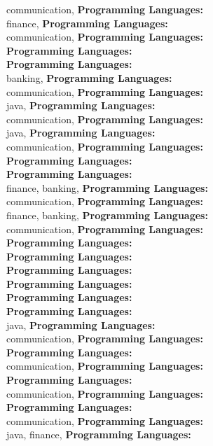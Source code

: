 communication, \textbf{Programming Languages:} \\
finance, \textbf{Programming Languages:} \\
communication, \textbf{Programming Languages:} \\
\textbf{Programming Languages:} \\
\textbf{Programming Languages:} \\
banking, \textbf{Programming Languages:} \\
communication, \textbf{Programming Languages:} \\
java, \textbf{Programming Languages:} \\
communication, \textbf{Programming Languages:} \\
java, \textbf{Programming Languages:} \\
communication, \textbf{Programming Languages:} \\
\textbf{Programming Languages:} \\
\textbf{Programming Languages:} \\
finance, banking, \textbf{Programming Languages:} \\
communication, \textbf{Programming Languages:} \\
finance, banking, \textbf{Programming Languages:} \\
communication, \textbf{Programming Languages:} \\
\textbf{Programming Languages:} \\
\textbf{Programming Languages:} \\
\textbf{Programming Languages:} \\
\textbf{Programming Languages:} \\
\textbf{Programming Languages:} \\
\textbf{Programming Languages:} \\
java, \textbf{Programming Languages:} \\
communication, \textbf{Programming Languages:} \\
\textbf{Programming Languages:} \\
communication, \textbf{Programming Languages:} \\
\textbf{Programming Languages:} \\
communication, \textbf{Programming Languages:} \\
\textbf{Programming Languages:} \\
communication, \textbf{Programming Languages:} \\
java, finance, \textbf{Programming Languages:} \\

